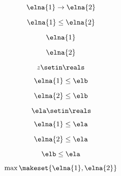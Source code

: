 \begin{forslides}
    \begin{equation}
        \label{eq:feedback-132}
        \elna{1}\to \elna{2}
    \end{equation}

    \begin{equation}
        \label{eq:feedback-133}
        \elna{1}\leq \elna{2}
    \end{equation}

    \begin{equation}
        \label{eq:feedback-134}
        \elna{1}
    \end{equation}

    \begin{equation}
        \label{eq:feedback-135}
        \elna{2}
    \end{equation}

    \begin{equation}
        \label{eq:feedback-136}
        z\setin \reals
    \end{equation}

    \begin{equation}
        \label{eq:feedback-137}
        \elna{1}\leq \elb
    \end{equation}

    \begin{equation}
        \label{eq:feedback-138}
        \elna{2}\leq \elb
    \end{equation}

    \begin{equation}
        \label{eq:feedback-139}
        \ela\setin \reals
    \end{equation}

    \begin{equation}
        \label{eq:feedback-140}
        \elna{1}\leq \ela
    \end{equation}

    \begin{equation}
        \label{eq:feedback-141}
        \elna{2}\leq \ela
    \end{equation}

    \begin{equation}
        \label{eq:feedback-142}
        \elb\leq \ela
    \end{equation}

    \begin{equation}
        \label{eq:feedback-143}
        \max\makeset{\elna{1},\elna{2}}
    \end{equation}


\end{forslides}
